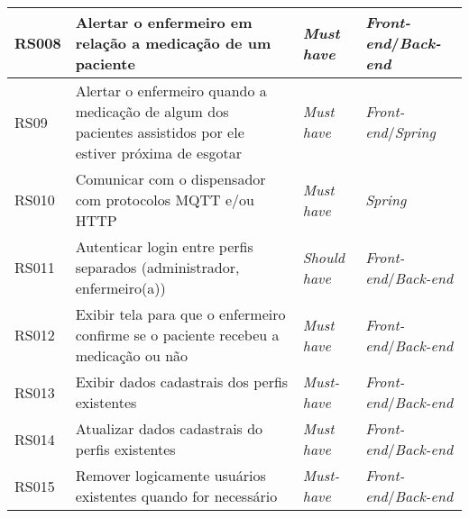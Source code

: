 \begin{table}[H]
\begin{adjustbox}{max width = \textwidth}
\begin{tabular}{|L{1.5cm}|L{8.5cm}|C{2.5cm}|C{3.5cm}|}
        \hline
        RS008 & Alertar o enfermeiro em relação a medicação de um paciente & \textit{Must have} & \textit{Front-end}/\textit{Back-end} \\ 
        \hline
        RS09 & Alertar o enfermeiro quando a medicação de algum dos pacientes assistidos por ele estiver próxima de esgotar & \textit{Must have} & \textit{Front-end}/\textit{Spring} \\
        \hline
        RS010 & Comunicar com o dispensador com protocolos MQTT e/ou HTTP & \textit{Must have} & \textit{Spring} \\ 
        \hline
        RS011 & Autenticar login entre perfis separados (administrador, enfermeiro(a)) & \textit{Should have} & \textit{Front-end}/\textit{Back-end} \\ 
        \hline
        RS012 & Exibir tela para que o enfermeiro confirme se o paciente recebeu a medicação ou não & \textit{Must have} & \textit{Front-end}/\textit{Back-end} \\ \hline
        RS013 & Exibir dados cadastrais dos perfis existentes & \textit{Must-have} & \textit{Front-end}/\textit{Back-end} \\ \hline
        RS014 & Atualizar dados cadastrais do perfis existentes & \textit{Must have} & \textit{Front-end}/\textit{Back-end} \\ \hline
        RS015 & Remover logicamente usuários existentes quando for necessário & \textit{Must-have} & \textit{Front-end}/\textit{Back-end} \\ \hline
        \end{tabular}
	\end{adjustbox}
	\label{tab:req_software}
\end{table}


